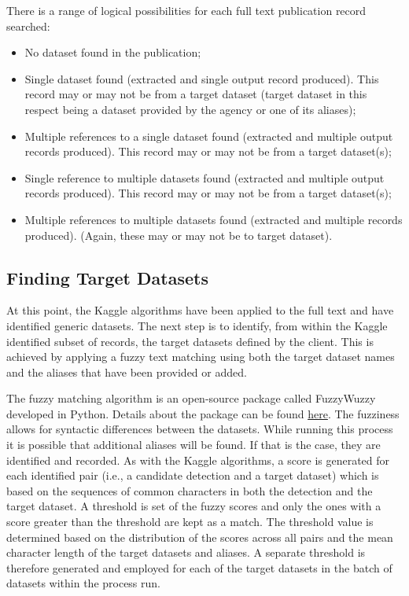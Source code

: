 \documentclass[titlepage, 11pt]{article}
\begin{document}
{There is a range of logical possibilities for each full text publication record searched:

\begin{itemize}
    \item No dataset found in the publication;
    \item Single dataset found (extracted and single output record produced). This record may or may not be from a target dataset (target dataset in this respect being a dataset provided by the agency or one of its aliases);
    \item Multiple references to a single dataset found (extracted and multiple output records produced). This record may or may not be from a target dataset(s);
    \item Single reference to multiple datasets found (extracted and multiple output records produced). This record may or may not be from a target dataset(s);
    \item Multiple references to multiple datasets found (extracted and multiple records produced). (Again, these may or may not be to target dataset).
\end{itemize}

\subsection{Finding Target Datasets}

At this point, the Kaggle algorithms have been applied to the full text and have identified generic datasets. The next step is to identify, from within the Kaggle identified subset of records, the target datasets defined by the client. This is achieved by applying a fuzzy text matching using both the target dataset names and the aliases that have been provided or added.

The fuzzy matching algorithm is an open-source package called FuzzyWuzzy developed in Python. Details about the package can be found \href{https://www.datacamp.com/tutorial/fuzzy-string-python}{here}. The fuzziness allows for syntactic differences between the datasets. While running this process it is possible that additional aliases will be found. If that is the case, they are identified and recorded. As with the Kaggle algorithms, a score is generated for each identified pair (i.e., a candidate detection and a target dataset) which is based on the sequences of common characters in both the detection and the target dataset. A threshold is set of the fuzzy scores and only the ones with a score greater than the threshold are kept as a match. The threshold value is determined based on the distribution of the scores across all pairs and the mean character length of the target datasets and aliases. A separate threshold is therefore generated and employed for each of the target datasets in the batch of datasets within the process run.

}
\end{document}
